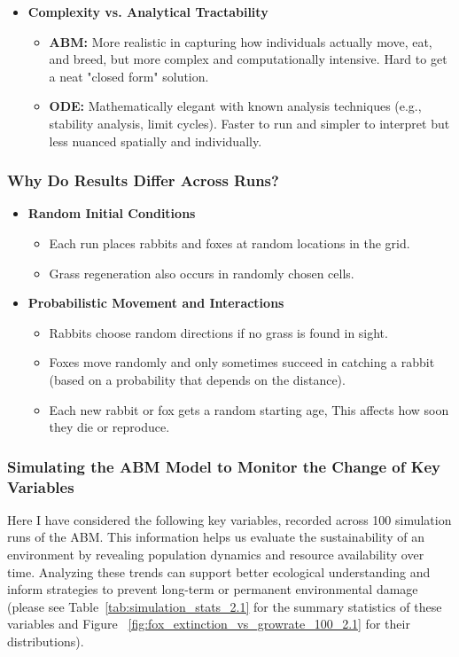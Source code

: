 \begin{itemize}
    \item \textbf{Complexity vs. Analytical Tractability}
    \begin{itemize}
        \item \textbf{ABM:} More realistic in capturing how individuals actually move, eat, and breed, but more complex and computationally intensive. Hard to get a neat "closed form" solution.
        \item \textbf{ODE:} Mathematically elegant with known analysis techniques (e.g., stability analysis, limit cycles). Faster to run and simpler to interpret but less nuanced spatially and individually.
    \end{itemize}
\end{itemize}

\subsubsection[short]{Why Do Results Differ Across Runs?}

\begin{itemize}
    \item \textbf{Random Initial Conditions}
    \begin{itemize}
        \item Each run places rabbits and foxes at random locations in the grid.
        \item Grass regeneration also occurs in randomly chosen cells.
    \end{itemize}

    \item \textbf{Probabilistic Movement and Interactions}
    \begin{itemize}
        \item Rabbits choose random directions if no grass is found in sight.
        \item Foxes move randomly and only sometimes succeed in catching a rabbit (based on a probability that depends on the distance).
        \item Each new rabbit or fox gets a random starting age, This affects how soon they die or reproduce.
    \end{itemize}

\end{itemize}

\subsubsection[short]{Simulating the ABM Model to Monitor the Change of Key Variables}
Here I have considered the following key variables, recorded across 100 simulation runs of the ABM. This information helps us evaluate the sustainability of an environment by revealing population dynamics and resource availability over time. Analyzing these trends can support better ecological understanding and inform strategies to prevent long-term or permanent environmental damage (please see Table~\ref{tab:simulation_stats_2.1} for the summary statistics of these variables and Figure ~\ref{fig:fox_extinction_vs_growrate_100_2.1} for their distributions).

